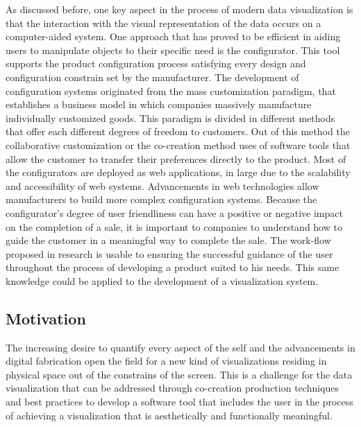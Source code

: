 As discussed before, one key aspect in the process of modern data visualization
is that the interaction with the visual representation of the data occurs on a
computer-aided system. One approach that has proved to be efficient in aiding
users to manipulate objects to their specific need is the configurator. This
tool supports the product configuration process satisfying every design and
configuration constrain set by the manufacturer\cite{hedin1998product}. 
The development of configuration systems originated from the mass customization
paradigm, that establishes a business model in which companies
massively manufacture individually customized 
goods\cite{felfernig2014knowledge}.
This paradigm is divided in different methods that offer each different degrees
of freedom to customers. Out of this method the
collaborative customization or the co-creation method uses of software
tools that allow the customer to transfer their preferences directly to the
product\cite{pine1999mass,piller2006user}. Most of the configurators are
deployed as web applications, in large due to the scalability and accessibility
of web systems. Advancements in web technologies allow manufacturers to build
more complex configuration systems. 
Because the configurator's degree of user friendliness can have a positive or
negative impact on the completion of a sale, it is important to companies to
understand how to guide the customer in a meaningful way to complete the
sale\cite{rolland2012commerce,abbasi2012s}. The work-flow proposed in research
is usable to ensuring the successful guidance of the user throughout the process
of developing a product suited to his needs. This same knowledge could be
applied to the development of a visualization system. 

\subsection{Motivation}
The increasing desire to quantify every aspect of the self and the advancements in digital 
fabrication open the field for a new kind of visualizations residing 
in physical space out of the constrains of the screen. This is a challenge for
the data visualization that can be addressed through co-creation production techniques and best
practices to develop a software tool that includes the user in
the process of achieving a visualization
that is aesthetically and functionally meaningful. 


